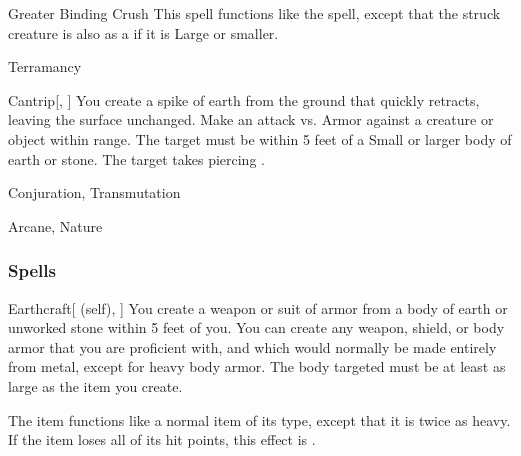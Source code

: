 \lowercase{\hypertarget{spell:Greater Binding Crush}{}}\label{spell:Greater Binding Crush}
\begin{ability}[\nth{5}]{\hypertarget{spell:Greater Binding Crush}{Greater Binding Crush}}
This spell functions like the  spell, except that the struck creature is also  as a  if it is Large or smaller.
\end{ability}
\vspace{0.25em}


\newpage
\begin{spellsection}{Terramancy}

\begin{spellheader}
\end{spellheader}


\begin{ability}{Cantrip}[, ]
You create a spike of earth from the ground that quickly retracts, leaving the surface unchanged.
Make an attack vs. Armor against a creature or object within \rngclose range.
The target must be within 5 feet of a Small or larger body of earth or stone.
\hit The target takes piercing .
\end{ability}




 Conjuration, Transmutation

 Arcane, Nature
\end{spellsection}


\subsubsection{Spells}


\lowercase{\hypertarget{spell:Earthcraft}{}}\label{spell:Earthcraft}
\begin{ability}[\nth{1}]{\hypertarget{spell:Earthcraft}{Earthcraft}}[ (self), ]
You create a weapon or suit of armor from a body of earth or unworked stone within 5 feet of you.
You can create any weapon, shield, or body armor that you are proficient with, and which would normally be made entirely from metal, except for heavy body armor.
The body targeted must be at least as large as the item you create.

The item functions like a normal item of its type, except that it is twice as heavy.
If the item loses all of its hit points, this effect is .
\end{ability}
\vspace{0.25em}



